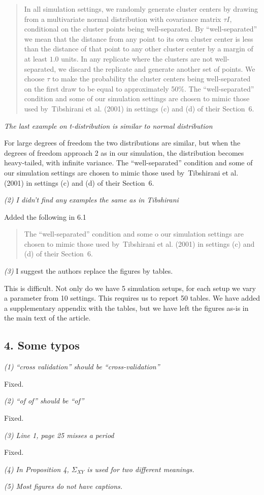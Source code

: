 \documentclass[11pt]{article}
\begin{document}
\begin{quote}
In all simulation settings, we randomly generate cluster centers by drawing
from a multivariate normal distribution with covariance matrix $\tau I$,
conditional on the cluster points being well-separated. By ``well-separated''
we mean that the distance from any point to its own cluster center is less
than the distance of that point to any other cluster center by a margin of at
least $1.0$ units. In any replicate where the clusters are not well-separated,
we discard the replicate and generate another set of points.  We choose $\tau$
to make the probability the cluster centers being well-separated on the first
draw to be equal to approximately 50\%.  The ``well-separated'' condition and
some of our simulation settings are chosen to mimic those used by~Tibshirani
et al. (2001) in settings (c) and (d) of their Section~6.
\end{quote}


\emph{The last example on t-distribution is similar to normal distribution}

For large degrees of freedom the two distributions are similar, but when the
degrees of freedom approach 2 as in our simulation, the distribution becomes
heavy-tailed, with infinite variance.  The ``well-separated'' condition and
some of our simulation settings are chosen to mimic those used by~Tibshirani
et al. (2001) in settings (c) and (d) of their Section~6.



\emph{(2) I didn't find any examples the same as in Tibshirani}

Added the following in 6.1

\begin{quote}
The ``well-separated'' condition and
some o our simulation settings are chosen to mimic those used by~Tibshirani
et al. (2001) in settings (c) and (d) of their Section~6.
\end{quote}

\emph{(3)} I suggest the authors replace the figures by tables.

This is difficult. Not only do we have 5 simulation setups, for each setup we
vary a parameter from 10 settings. This requires us to report 50 tables. We
have added a supplementary appendix with the tables, but we have left the
figures as-is in the main text of the article.


\subsection{4. Some typos}

\emph{(1) ``cross validation'' should be ``cross-validation''}

Fixed.

\emph{(2) ``of of'' should be ``of''}

Fixed.

\emph{(3) Line 1, page 25 misses a period}

Fixed.

\emph{(4) In Proposition 4, $\Sigma_{XY}$ is used for two different meanings.}

\emph{(5) Most figures do not have captions.}




\end{document}
